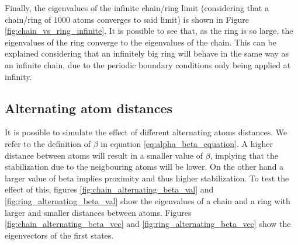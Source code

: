\documentclass{article}
\begin{document}
Finally, the eigenvalues of the infinite chain/ring limit (considering that a chain/ring of $1000$ atoms converges to said limit) is shown in Figure \ref{fig:chain_vs_ring_infinite}. It is possible to see that, as the ring is so large, the eigenvalues of the ring converge to the eigenvalues of the chain. This can be explained considering that an infinitely big ring will behave in the same way as an infinite chain, due to the periodic boundary conditions only being applied at infinity. 

\subsection{Alternating atom distances}
It is possible to simulate the effect of different alternating atoms distances. We refer to the definition of $\beta$ in equation \ref{eq:alpha_beta_equation}. A higher distance between atoms will result in a smaller value of $\beta$, implying that the stabilization due to the neigbouring atoms will be lower. On the other hand a larger value of beta implies proximity and thus higher stabilization. To test the effect of this, figures \ref{fig:chain_alternating_beta_val} and \ref{fig:ring_alternating_beta_val} show the eigenvalues of a chain and a ring with larger and smaller distances between atoms. Figures \ref{fig:chain_alternating_beta_vec} and \ref{fig:ring_alternating_beta_vec} show the eigenvectors of the first states.
\end{document}
